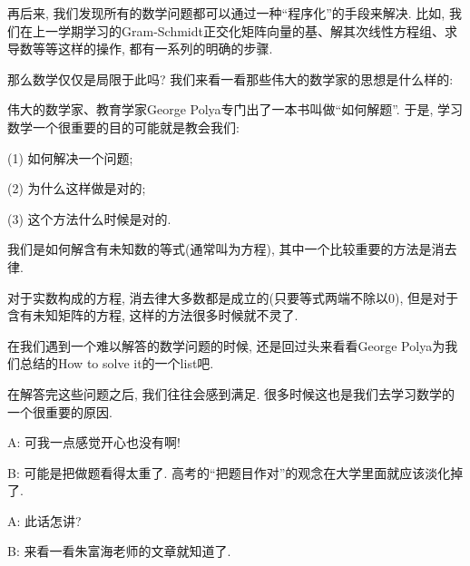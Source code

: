 再后来, 我们发现所有的数学问题都可以通过一种``程序化''的手段来解决. 比如, 我们在上一学期学习的Gram-Schmidt正交化矩阵向量的基、解其次线性方程组、求导数等等这样的操作, 都有一系列的明确的步骤. 

那么数学仅仅是局限于此吗? 我们来看一看那些伟大的数学家的思想是什么样的: 

伟大的数学家、教育学家George Polya专门出了一本书叫做``如何解题''. 于是, 学习数学一个很重要的目的可能就是教会我们:

(1) 如何解决一个问题;

(2) 为什么这样做是对的;

(3) 这个方法什么时候是对的. 

\begin{example}
	我们是如何解含有未知数的等式(通常叫为方程), 其中一个比较重要的方法是消去律. 
	
	对于实数构成的方程, 消去律大多数都是成立的(只要等式两端不除以0), 但是对于含有未知矩阵的方程, 这样的方法很多时候就不灵了. 
\end{example}

在我们遇到一个难以解答的数学问题的时候, 还是回过头来看看George Polya为我们总结的How to solve it的一个list吧. 


在解答完这些问题之后, 我们往往会感到满足. 很多时候这也是我们去学习数学的一个很重要的原因. 

\begin{dialogue}
A: 可我一点感觉开心也没有啊! 

B: 可能是把做题看得太重了. 高考的``把题目作对''的观念在大学里面就应该淡化掉了. 

A: 此话怎讲?

B: 来看一看朱富海老师的文章就知道了. 

\end{dialogue}

